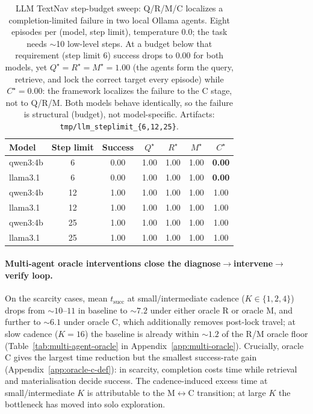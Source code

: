 \documentclass{article}
\begin{document}
\begin{table}[h]
  \caption{LLM TextNav step-budget sweep: Q/R/M/C localizes a completion-limited failure in two local Ollama agents. Eight episodes per (model, step limit), temperature 0.0; the task needs $\sim$10 low-level steps. At a budget below that requirement (step limit 6) success drops to $0.00$ for both models, yet $Q^\star{=}R^\star{=}M^\star{=}1.00$ (the agents form the query, retrieve, and lock the correct target every episode) while $C^\star{=}0.00$: the framework localizes the failure to the C stage, not to Q/R/M. Both models behave identically, so the failure is structural (budget), not model-specific. Artifacts: \texttt{tmp/llm\_steplimit\_\{6,12,25\}}.}
  \label{tab:llm-smoke}
  \centering
  \small
  \begin{tabular}{l c c c c c c}
    \toprule
    Model & Step limit & Success & $Q^\star$ & $R^\star$ & $M^\star$ & $C^\star$ \\
    \midrule
    qwen3:4b & 6  & 0.00 & 1.00 & 1.00 & 1.00 & \textbf{0.00} \\
    llama3.1 & 6  & 0.00 & 1.00 & 1.00 & 1.00 & \textbf{0.00} \\
    \midrule
    qwen3:4b & 12 & 1.00 & 1.00 & 1.00 & 1.00 & 1.00 \\
    llama3.1 & 12 & 1.00 & 1.00 & 1.00 & 1.00 & 1.00 \\
    qwen3:4b & 25 & 1.00 & 1.00 & 1.00 & 1.00 & 1.00 \\
    llama3.1 & 25 & 1.00 & 1.00 & 1.00 & 1.00 & 1.00 \\
    \bottomrule
  \end{tabular}
\end{table}

\paragraph{Multi-agent oracle interventions close the diagnose$\to$intervene$\to$verify loop.}
On the scarcity cases, mean $t_{\mathrm{succ}}$ at small/intermediate cadence ($K{\in}\{1,2,4\}$) drops from $\sim10$--$11$ in baseline to $\sim7.2$ under either oracle R or oracle M, and further to $\sim6.1$ under oracle C, which additionally removes post-lock travel; at slow cadence ($K{=}16$) the baseline is already within $\sim1.2$ of the R/M oracle floor (Table~\ref{tab:multi-agent-oracle} in Appendix~\ref{app:multi-oracle}). Crucially, oracle C gives the largest time reduction but the smallest success-rate gain (Appendix~\ref{app:oracle-c-def}): in scarcity, completion costs time while retrieval and materialisation decide success. The cadence-induced excess time at small/intermediate $K$ is attributable to the M$\leftrightarrow$C transition; at large $K$ the bottleneck has moved into solo exploration.
\end{document}
